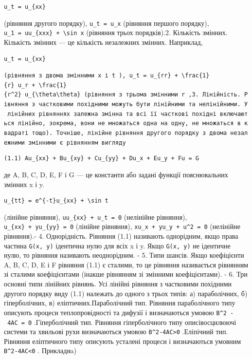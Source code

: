 \documentclass[
  ukrainian,
]{article}
\begin{document}
\begin{verbatim}
u_t = u_{xx}
\end{verbatim}

(рівняння другого порядку), \texttt{u\_t\ =\ u\_x} (рівняння першого
порядку), \texttt{u\_1\ =\ uu\_\{xxx\}\ +\ \textbackslash{}sin\ x}
(рівняння трьох порядків).2. Кількість змінних. Кількість змінних --- це
кількість незалежних змінних. Наприклад,

\begin{verbatim}
u_t = u_{xx}
\end{verbatim}

\texttt{(рівняння\ з\ двома\ змінними\ \textquotesingle{}x\textquotesingle{}\ і\ \textquotesingle{}t\textquotesingle{}\ ),\ \textquotesingle{}u\_t\ =\ u\_\{rr\}\ +\ \textbackslash{}frac\{1\}\{r\}\ u\_r\ +\ \textbackslash{}frac\{1\}\{r\^{}2\}\ u\_\{\textbackslash{}theta\textbackslash{}theta\}\textquotesingle{}\ (рівняння\ з\ трьома\ змінними\ \textquotesingle{}r\textquotesingle{}\ ,3.\ Лінійність.\ Рівняння\ з\ частковими\ похідними\ можуть\ бути\ лінійними\ та\ нелінійними.\ У\ лінійних\ рівняннях\ залежна\ змінна\ та\ всі\ її\ часткові\ похідні\ включаються\ лінійно,\ зокрема,\ вони\ не\ множаться\ одна\ на\ одну,\ не\ множаться\ в\ квадраті\ тощо).\ Точніше,\ лінійне\ рівняння\ другого\ порядку\ з\ двома\ незалежними\ змінними\ є\ рівнянням\ вигляду}

\begin{verbatim}
(1.1) Au_{xx} + Bu_{xy} + Cu_{yy} + Du_x + Eu_y + Fu = G
\end{verbatim}

де A, B, C, D, E, F і G --- це константи або задані функції
пояснювальних змінних x і y.

\begin{verbatim}
u_{tt} = e^{-t}u_{xx} + \sin t
\end{verbatim}

(лінійне рівняння), \texttt{uu\_\{xx\}\ +\ u\_t\ =\ 0} (нелінійне
рівняння), \texttt{u\_\{xx\}\ +\ yu\_\{yy\}\ =\ 0} (лінійне рівняння),
\texttt{xu\_x\ +\ yu\_y\ +\ u\^{}2\ =\ 0} (нелінійне рівняння).- 4.
Однорідність. Рівняння (1.1) називають однорідним, якщо права частина
\texttt{G(x,\ y)} ідентична нулю для всіх x і y. Якщо \texttt{G(x,\ y)}
не ідентичне нулю, то рівняння називають неоднорідним. - 5. Типи шансів.
Якщо коефіцієнти A, B, C, D, E і F рівняння (1.1) є сталими, то це
рівняння називається рівнянням зі сталими коефіцієнтами (інакше
рівнянням зі змінними коефіцієнтами). - 6. Три основні типи лінійних
рівнянь. Усі лінійні рівняння з частковими похідними другого порядку
виду (1.1) належать до одного з трьох типів: а) параболічних, б)
гіперболічних, в) еліптичних.Параболічний тип. Рівняння параболічного
типу описують процеси теплопровідності та дифузії і визначаються умовою
\texttt{B\^{}2\ -\ 4AC\ =\ 0} .Гіперболічний тип. Рівняння
гіперболічного типу описівосцилюючі системи та хвильові рухи
визначаються умовою \texttt{B\^{}2-4AC\textgreater{}0} .Еліпічний тип.
Рівняння еліптичного типу описують усталені процеси і визначаються
умовним \texttt{B\^{}2-4AC\textless{}0} . Прикладиa)
\end{document}

